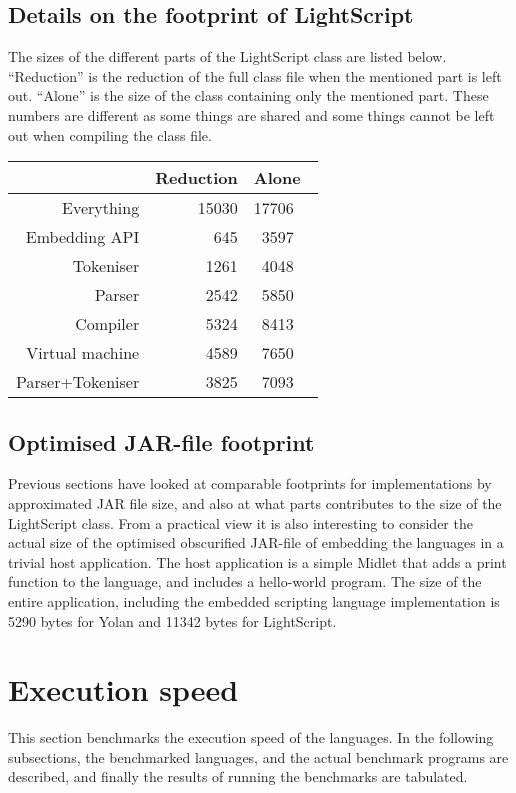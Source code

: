 \documentclass[11pt]{report}
\begin{document}

\subsection{Details on the footprint of LightScript}
The sizes of the different parts of the LightScript class are listed below.
``Reduction'' is the reduction of the full class file when the mentioned part is left out. ``Alone'' is the size of the class containing only the mentioned part. These numbers are different as some things are shared and some things cannot be left out when compiling the class file.

\begin{center} \begin{tabular}{|r|r|rl|} \hline
&\multicolumn{1}{|r|}{Reduction} & \multicolumn{2}{|l|}{Alone}\\ \hline
Everything & 15030 & 17706 & \\ \hline
Embedding API & 645  & 3597  & \\ \hline
Tokeniser & 1261 & 4048 & \\ \hline
Parser & 2542 & 5850 & \\ \hline
Compiler & 5324 & 8413 & \\ \hline
Virtual machine & 4589 & 7650 & \\ \hline
Parser+Tokeniser & 3825 & 7093 & \\ \hline
\end{tabular} \end{center}

\subsection{Optimised JAR-file footprint}
Previous sections have looked at comparable footprints for implementations by approximated JAR file size, and also at what parts contributes to the size of the LightScript class.
From a practical view it is also interesting to consider the actual size of the optimised obscurified JAR-file of embedding the languages in a trivial host application.
The host application is a simple Midlet that adds a print function to the language, and includes a hello-world program.
The size of the entire application, including the embedded scripting language implementation is 5290 bytes for Yolan and 11342 bytes for LightScript.

\section{Execution speed}
This section benchmarks the execution speed of the languages. 
In the following subsections, the benchmarked languages, and the actual benchmark programs are described, and finally the results of running the benchmarks are tabulated. 
\end{document}
